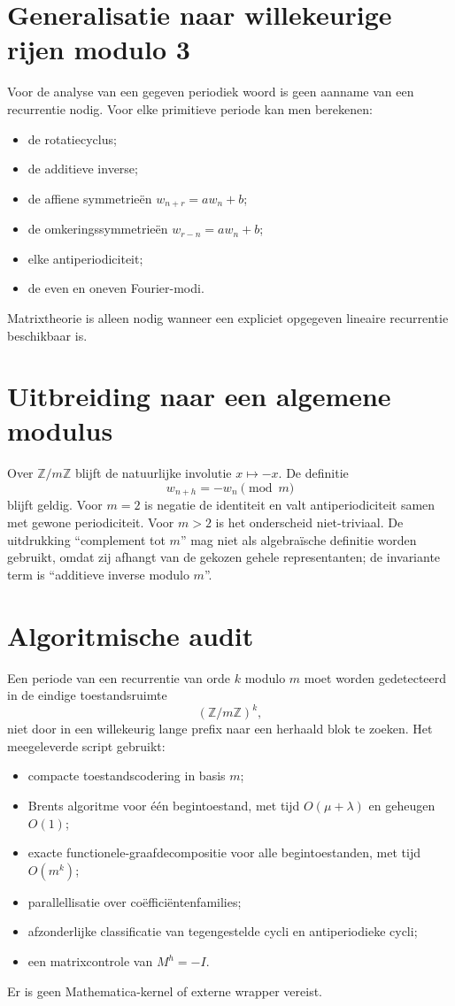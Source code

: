 \documentclass[11pt,a4paper]{article}
\newcommand{\Z}{\mathbb{Z}}
\begin{document}
\section{Generalisatie naar willekeurige rijen modulo 3}
Voor de analyse van een gegeven periodiek woord is geen aanname van een recurrentie nodig. Voor elke primitieve periode kan men berekenen:
\begin{itemize}
\item de rotatiecyclus;
\item de additieve inverse;
\item de affiene symmetrieën $w_{n+r}=aw_n+b$;
\item de omkeringssymmetrieën $w_{r-n}=aw_n+b$;
\item elke antiperiodiciteit;
\item de even en oneven Fourier-modi.
\end{itemize}
Matrixtheorie is alleen nodig wanneer een expliciet opgegeven lineaire recurrentie beschikbaar is.

\section{Uitbreiding naar een algemene modulus}
Over $\Z/m\Z$ blijft de natuurlijke involutie $x\mapsto-x$. De definitie
\[
w_{n+h}=-w_n\pmod m
\]
blijft geldig. Voor $m=2$ is negatie de identiteit en valt antiperiodiciteit samen met gewone periodiciteit. Voor $m>2$ is het onderscheid niet-triviaal. De uitdrukking ``complement tot $m$'' mag niet als algebraïsche definitie worden gebruikt, omdat zij afhangt van de gekozen gehele representanten; de invariante term is ``additieve inverse modulo $m$''.

\clearpage
\section{Algoritmische audit}
Een periode van een recurrentie van orde $k$ modulo $m$ moet worden gedetecteerd in de eindige toestandsruimte
\[
(\Z/m\Z)^k,
\]
niet door in een willekeurig lange prefix naar een herhaald blok te zoeken. Het meegeleverde script gebruikt:
\begin{itemize}
\item compacte toestandscodering in basis $m$;
\item Brents algoritme voor één begintoestand, met tijd $O(\mu+\lambda)$ en geheugen $O(1)$;
\item exacte functionele-graafdecompositie voor alle begintoestanden, met tijd $O(m^k)$;
\item parallellisatie over coëfficiëntenfamilies;
\item afzonderlijke classificatie van tegengestelde cycli en antiperiodieke cycli;
\item een matrixcontrole van $M^h=-I$.
\end{itemize}
Er is geen Mathematica-kernel of externe wrapper vereist.
\end{document}
